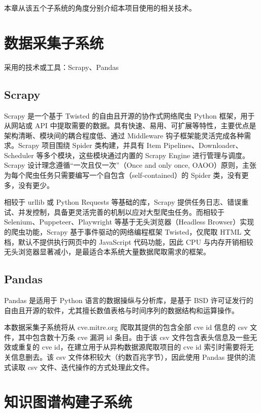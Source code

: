 \documentclass[a4paper,AutoFakeBold,oneside,12pt]{book}
\begin{document}
本章从该五个子系统的角度分别介绍本项目使用的相关技术。

\section{数据采集子系统}

采用的技术或工具：Scrapy、Pandas

\subsection{Scrapy}

Scrapy 是一个基于 Twisted 的自由且开源的协作式网络爬虫 Python 框架，用于从网站或 API 中提取需要的数据。具有快速、易用、可扩展等特性，主要优点是架构清晰、模块间的耦合程度低、通过 Middleware 钩子框架能灵活完成各种需求。Scrapy 项目围绕 Spider 类构建，并具有 Item Pipelines、Downloader、Scheduler 等多个模块，这些模块通过内置的 Scrapy Engine 进行管理与调度。Scrapy 设计理念遵循“一次且仅一次”（Once and only once, OAOO）原则，主张为每个爬虫任务只需要编写一个自包含（self-contained）的 Spider 类，没有更多，没有更少。

相较于 urllib 或 Python Requests 等基础的库，Scrapy 提供任务日志、错误重试、并发控制，具备更灵活完善的机制以应对大型爬虫任务。而相较于 Selenium、Puppeteer、Playwright 等基于无头浏览器（Headless Browser）实现的爬虫功能，Scrapy 基于事件驱动的网络编程框架 Twisted，仅爬取 HTML 文档，默认不提供执行网页中的 JavaScript 代码功能，因此 CPU 与内存开销相较无头浏览器显著减小，是最适合本系统大量数据爬取需求的框架。

\subsection{Pandas}

Pandas 是适用于 Python 语言的数据操纵与分析库，是基于 BSD 许可证发行的自由且开源的软件，尤其擅长数值表格与时间序列的数据结构和运算操作。

本数据采集子系统将从 cve.mitre.org 爬取其提供的包含全部 cve id 信息的 csv 文件，其中包含数十万条 cve 漏洞 id 条目。由于该 csv 文件包含表头信息及一些无效或重复的 cve id，在建立用于从异构数据源爬取项目的 cve id 索引时需要将无关信息删去。该 csv 文件体积较大（约数百兆字节），因此使用 Pandas 提供的流式读取 csv 文件、迭代操作的方式处理此文件。

\section{知识图谱构建子系统}
\end{document}
